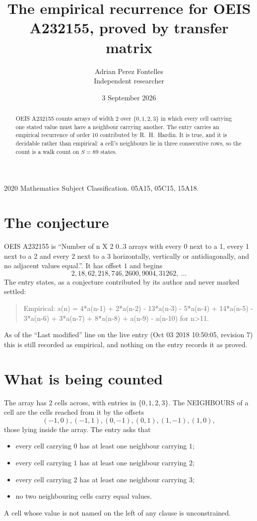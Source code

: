 \documentclass[11pt,a4paper]{article}
\title{The empirical recurrence for OEIS A232155, proved by transfer matrix}
\author{Adrian Perez Fontelles\\ \small Independent researcher}
\date{3 September 2026}
\theoremstyle{plain}
\theoremstyle{definition}
\begin{document}
\maketitle

\begin{abstract}
OEIS A232155 counts arrays of width $2$ over $\{0,1,2,3\}$ in which every cell carrying one stated
value must have a neighbour carrying another. The entry carries an empirical recurrence of
order $10$ contributed by R.~H.~Hardin. It is true, and it is decidable rather than
empirical: a cell's neighbours lie in three consecutive rows, so the count is a walk count on
$S=89$ states.
\end{abstract}

\noindent\small 2020 Mathematics Subject Classification. 05A15, 05C15, 15A18.\normalsize

\section{The conjecture}

OEIS A232155 is ``Number of n X 2 0..3 arrays with every 0 next to a 1, every 1 next to a 2 and every 2 next to a 3 horizontally, vertically or antidiagonally, and no adjacent values equal.''. It has offset $1$ and begins
\[
2, 18, 62, 218, 746, 2600, 9004, 31262,\ \dots
\]
The entry states, as a conjecture contributed by its author and never marked settled:
\begin{quote}
Empirical: a(n) = 4*a(n-1) + 2*a(n-2) - 13*a(n-3) - 5*a(n-4) + 14*a(n-5) - 3*a(n-6) + 3*a(n-7) + 8*a(n-8) + a(n-9) - a(n-10) for n>11.
\end{quote}
As of the ``Last modified'' line on the live entry (Oct 03 2018 10:50:05, revision 7) this is still
recorded as empirical, and nothing on the entry records it as proved.

\section{What is being counted}

The array has $2$ cells across, with entries in $\{0,1,2,3\}$. The NEIGHBOURS of a cell are the
cells reached from it by the offsets
\[
(-1,0), (-1,1), (0,-1), (0,1), (1,-1), (1,0),
\]
those lying inside the array. The entry asks that
\begin{itemize}
\item every cell carrying $0$ has at least one neighbour carrying $1$;
\item every cell carrying $1$ has at least one neighbour carrying $2$;
\item every cell carrying $2$ has at least one neighbour carrying $3$;
\item no two neighbouring cells carry equal values.
\end{itemize}
A cell whose value is not named on the left of any clause is unconstrained.
\end{document}
